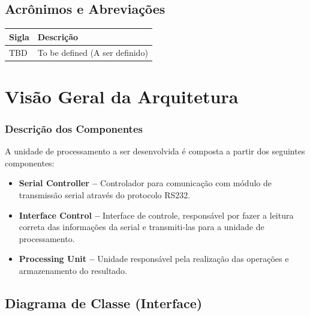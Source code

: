 \documentclass{report}
\begin{document}
  \section{Acrônimos e Abreviações}
    \FloatBarrier
    \begin{table}[H]
      \begin{center}
        \begin{tabular}[pos]{|m{2cm} | m{12cm}|} 
          \hline
          \cellcolor[gray]{0.9}\textbf{Sigla} & \cellcolor[gray]{0.9}\textbf{Descrição} \\ \hline
          TBD      &  To be defined (A ser definido)  \\ \hline
        \end{tabular}
      \end{center}
    \end{table}  

\chapter{Visão Geral da Arquitetura}

  \subsection{Descrição dos Componentes}
  A unidade de processamento a ser desenvolvida é composta a partir dos seguintes componentes:

  \begin{itemize}
    \item \textbf{Serial Controller --} Controlador para comunicação com módulo de transmissão serial através do protocolo RS232.
    \item \textbf{Interface Control --} Interface de controle, responsável por fazer a leitura correta das informações da serial e transmiti-las para a unidade de processamento.
    \item \textbf{Processing Unit --} Unidade responsável pela realização das operações e armazenamento do resultado.
  \end{itemize}

  \section{Diagrama de Classe (Interface)}
  \begin{figure}[H]
    \centering
    
  \end{figure}
\end{document}
